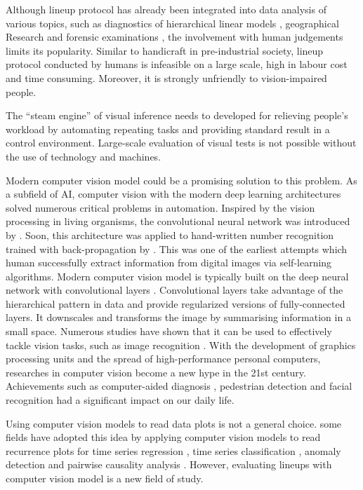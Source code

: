 \documentclass{monashthesis}
\theoremstyle{definition}
\theoremstyle{definition}
\theoremstyle{definition}
\theoremstyle{definition}
\theoremstyle{remark}
\begin{document}
Although lineup protocol has already been integrated into data analysis of various topics, such as diagnostics of hierarchical linear models \autocite{loy_diagnostic_2013}, geographical Research \autocite{widen_graphical_2016} and forensic examinations \autocite{krishnan_hierarchical_2021}, the involvement with human judgements limits its popularity. Similar to handicraft in pre-industrial society, lineup protocol conducted by humans is infeasible on a large scale, high in labour cost and time consuming. Moreover, it is strongly unfriendly to vision-impaired people.

The ``steam engine'' of visual inference needs to developed for relieving people's workload by automating repeating tasks and providing standard result in a control environment. Large-scale evaluation of visual tests is not possible without the use of technology and machines.

Modern computer vision model could be a promising solution to this problem. As a subfield of AI, computer vision with the modern deep learning architectures solved numerous critical problems in automation. Inspired by the vision processing in living organisms, the convolutional neural network was introduced by \textcite{fukushima_neocognitron_1982}. Soon, this architecture was applied to hand-written number recognition trained with back-propagation by \textcite{lecun_backpropagation_1989}. This was one of the earliest attempts which human successfully extract information from digital images via self-learning algorithms. Modern computer vision model is typically built on the deep neural network with convolutional layers \autocite{fukushima_neocognitron_1982}. Convolutional layers take advantage of the hierarchical pattern in data and provide regularized versions of fully-connected layers. It downscales and transforms the image by summarising information in a small space. Numerous studies have shown that it can be used to effectively tackle vision tasks, such as image recognition \autocite{rawat_deep_2017}. With the development of graphics processing units and the spread of high-performance personal computers, researches in computer vision become a new hype in the 21st century. Achievements such as computer-aided diagnosis \autocite{lee_image_2015}, pedestrian detection \autocite{brunetti_computer_2018} and facial recognition \autocite{emami_facial_2012} had a significant impact on our daily life.

Using computer vision models to read data plots is not a general choice. some fields have adopted this idea by applying computer vision models to read recurrence plots for time series regression \autocite{ojeda_multivariate_2020}, time series classification \autocite{chu_automatic_2019,hailesilassie_financial_2019,hatami_classification_2018,zhang_encoding_2020}, anomaly detection \autocite{chen_convolutional_2020} and pairwise causality analysis \autocite{singh_deep_2017}. However, evaluating lineups with computer vision model is a new field of study.
\end{document}
